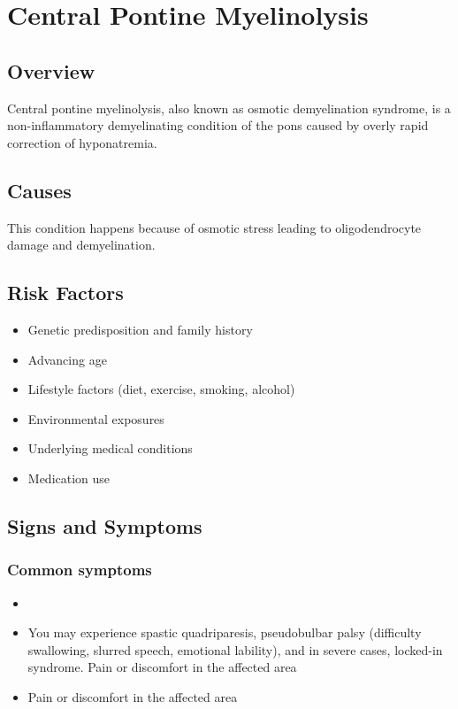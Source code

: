 \chapter{Central Pontine Myelinolysis}
\label{sec:Central Pontine Myelinolysis}

\section{Overview}
Central pontine myelinolysis, also known as osmotic demyelination syndrome, is a non-inflammatory demyelinating condition of the pons caused by overly rapid correction of hyponatremia.
\section{Causes}
This condition happens because of osmotic stress leading to oligodendrocyte damage and demyelination.     
\section{Risk Factors}

\begin{itemize}[noitemsep]
  \item Genetic predisposition and family history
  \item Advancing age
  \item Lifestyle factors (diet, exercise, smoking, alcohol)
  \item Environmental exposures
  \item Underlying medical conditions
  \item Medication use
\end{itemize}
\section{Signs and Symptoms}

\subsection{Common symptoms}
\begin{itemize}[noitemsep]
  \item \item You may experience spastic quadriparesis, pseudobulbar palsy (difficulty swallowing, slurred speech, emotional lability), and in severe cases, locked-in syndrome. Pain or discomfort in the affected area    \item Pain or discomfort in the affected area
  \end{itemize}

